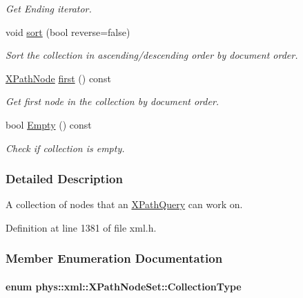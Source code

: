 \begin{DoxyCompactItemize}
\begin{DoxyCompactList}\small\item\em Get Ending iterator. \item\end{DoxyCompactList}\item 
void \hyperlink{classphys_1_1xml_1_1XPathNodeSet_a509bb7206dfc0fa79887c7ab7c5999db}{sort} (bool reverse=false)
\begin{DoxyCompactList}\small\item\em Sort the collection in ascending/descending order by document order. \item\end{DoxyCompactList}\item 
\hyperlink{classphys_1_1xml_1_1XPathNode}{XPathNode} \hyperlink{classphys_1_1xml_1_1XPathNodeSet_ae38baf21701ebbe42af3abfb6976d100}{first} () const 
\begin{DoxyCompactList}\small\item\em Get first node in the collection by document order. \item\end{DoxyCompactList}\item 
bool \hyperlink{classphys_1_1xml_1_1XPathNodeSet_a91fa85dbf474c51bc7a9df1baf38d43a}{Empty} () const 
\begin{DoxyCompactList}\small\item\em Check if collection is empty. \item\end{DoxyCompactList}\end{DoxyCompactItemize}


\subsubsection{Detailed Description}
A collection of nodes that an \hyperlink{classphys_1_1xml_1_1XPathQuery}{XPathQuery} can work on. 

Definition at line 1381 of file xml.h.



\subsubsection{Member Enumeration Documentation}
\hypertarget{classphys_1_1xml_1_1XPathNodeSet_ab178d39e119369702541033c067a995c}{
\paragraph[{CollectionType}]{\setlength{\rightskip}{0pt plus 5cm}enum {\bf phys::xml::XPathNodeSet::CollectionType}}\hfill}
\label{de/dc2/classphys_1_1xml_1_1XPathNodeSet_ab178d39e119369702541033c067a995c}


